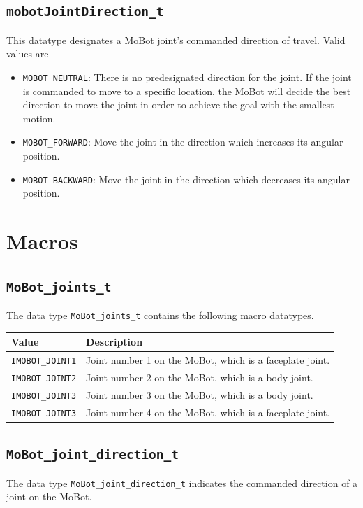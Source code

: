 \documentclass{article}
\begin{document}
\subsection{\label{sec:mobotJointDirection_t}\texttt{mobotJointDirection\_t}}
This datatype designates a MoBot joint's commanded direction of travel. Valid values
are
\begin{itemize}
\item \texttt{MOBOT\_NEUTRAL}: There is no predesignated direction for the
joint. If the joint is commanded to move to a specific location, the MoBot will
decide the best direction to move the joint in order to achieve the goal with
the smallest motion.
\item \texttt{MOBOT\_FORWARD}: Move the joint in the direction which increases its 
angular position.
\item \texttt{MOBOT\_BACKWARD}: Move the joint in the direction which decreases
its angular position.
\end{itemize}

\section{Macros}

\subsection{\texttt{MoBot\_joints\_t}}
The data type \texttt{MoBot\_joints\_t} contains the following macro datatypes.\\

\begin{tabular}{p{3cm}p{7cm}} \hline 
Value & Description \\
\hline 
\texttt{IMOBOT\_JOINT1} & Joint number 1 on the MoBot, which is a faceplate joint. \\
\texttt{IMOBOT\_JOINT2} & Joint number 2 on the MoBot, which is a body joint. \\
\texttt{IMOBOT\_JOINT3} & Joint number 3 on the MoBot, which is a body joint. \\
\texttt{IMOBOT\_JOINT3} & Joint number 4 on the MoBot, which is a faceplate joint. 
\end{tabular}

\subsection{\texttt{MoBot\_joint\_direction\_t}}
The data type \texttt{MoBot\_joint\_direction\_t} indicates the commanded direction 
of a joint on the MoBot.
\end{document}
